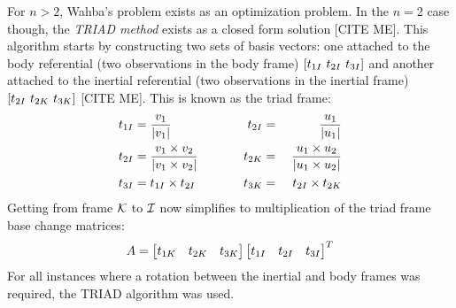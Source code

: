 For $n > 2$, Wahba's problem exists as an optimization problem.
In the $n = 2$ case though, the \textit{TRIAD method} exists as a closed form solution [CITE ME].
This algorithm starts by constructing two sets of basis vectors: one attached to the body referential (two
observations in the body frame) $\left[ t_{1I} \ t_{2I} \ t_{3I} \right]$ and another attached to
the inertial referential (two observations in the inertial frame) $\left[ t_{2I} \ t_{2K} \ t_{3K}
\right]$ [CITE ME].
This is known as the triad frame:
\begin{alignat}{2}
    t_{1I} &= \frac{v_1}{\left| v_1 \right|} &t_{2I} &{}={}&
        \frac{u_1}{\left| u_1 \right|} \\
    t_{2I} &= \frac{v_1 \times v_2}{\left| v_1 \times v_2 \right|} \ \ \ \ \ \ \ \
        &t_{2K} &{}={}& \frac{u_1 \times u_2}{\left| u_1 \times u_2 \right|} \\
    t_{3I} &= t_{1I} \times t_{2I} &t_{3K} &{}={}& t_{2I} \times t_{2K}
\end{alignat}
Getting from frame $\mathcal{K}$ to $\mathcal{I}$ now simplifies to multiplication of the triad frame base change matrices:
\begin{equation}
    A =
    \begin{bmatrix}
        t_{1K} & t_{2K} & t_{3K}
    \end{bmatrix}
    \begin{bmatrix}
        t_{1I} & t_{2I} & t_{3I}
    \end{bmatrix}^T
\end{equation}
For all instances where a rotation between the inertial and body frames was required, the TRIAD algorithm was used.

